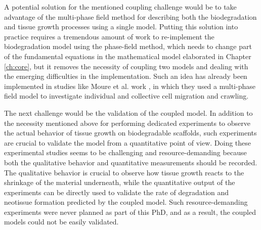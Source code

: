 A potential solution for the mentioned coupling challenge would be to take advantage of the multi-phase field method for describing both the biodegradation and tissue growth processes using a single model. Putting this solution into practice requires a tremendous amount of work to re-implement the biodegradation model using the phase-field method, which needs to change part of the fundamental equations in the mathematical model elaborated in Chapter \ref{ch:core}, but it removes the necessity of coupling two models and dealing with the emerging difficulties in the implementation. Such an idea has already been implemented in studies like Moure et al. work \cite{Moure2019,Moure2017Thesis}, in which they used a multi-phase field model to investigate individual and collective cell migration and crawling.


The next challenge would be the validation of the coupled model. In addition to the necessity mentioned above for performing dedicated experiments to observe the actual behavior of tissue growth on biodegradable scaffolds, such experiments are crucial to validate the model from a quantitative point of view. Doing these experimental studies seems to be challenging and resource-demanding because both the qualitative behavior and quantitative measurements should be recorded. The qualitative behavior is crucial to observe how tissue growth reacts to the shrinkage of the material underneath, while the quantitative output of the experiments can be directly used to validate the rate of degradation and neotissue formation predicted by the coupled model. Such resource-demanding experiments were never planned as part of this PhD, and as a result, the coupled models could not be easily validated.


